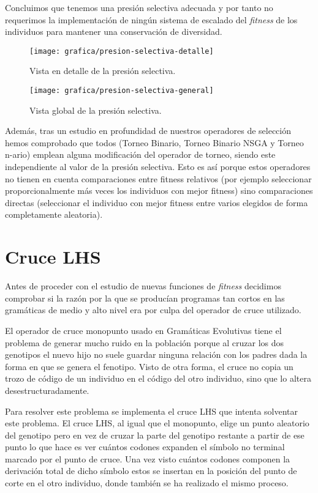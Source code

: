 Concluimos que tenemos una presión selectiva adecuada y por tanto no requerimos la implementación de ningún sistema de escalado del \textit{fitness} de los individuos para mantener una conservación de diversidad.
\begin{figure}[H]
\centering
\texttt{[image: grafica/presion-selectiva-detalle]}
\caption{Vista en detalle  de la presión selectiva.}
\end{figure}

\begin{figure}[H]
\centering
\texttt{[image: grafica/presion-selectiva-general]}
\caption{Vista global de la presión selectiva.}
\end{figure}

Además, tras un estudio en profundidad de nuestros operadores de selección hemos comprobado que todos (Torneo Binario, Torneo Binario NSGA y Torneo n-ario) emplean alguna modificación del operador de torneo, siendo este independiente al valor de la presión selectiva. Esto es así porque estos operadores no tienen en cuenta comparaciones entre fitness relativos (por ejemplo seleccionar proporcionalmente más veces los individuos con mejor fitness) sino comparaciones directas (seleccionar el individuo con mejor fitness entre varios elegidos de forma completamente aleatoria).

\section{Cruce LHS}
Antes de proceder con el estudio de nuevas funciones de \textit{fitness} decidimos comprobar si la razón por la que se producían programas tan cortos en las gramáticas de medio y alto nivel era por culpa del operador de cruce utilizado.

El operador de cruce monopunto usado en Gramáticas Evolutivas tiene el problema de generar mucho ruido en la población porque al cruzar los dos genotipos el nuevo hijo no suele guardar ninguna relación con los padres dada la forma en que se genera el fenotipo. Visto de otra forma, el cruce no copia un trozo de código de un individuo en el código del otro individuo, sino que lo altera desestructuradamente.

Para resolver este problema se implementa el cruce LHS que intenta solventar este problema. El cruce LHS, al igual que el monopunto, elige un punto aleatorio del genotipo pero en vez de cruzar la parte del genotipo restante a partir de ese punto lo que hace es ver cuántos codones expanden el símbolo no terminal marcado por el punto de cruce. Una vez visto cuántos codones componen la derivación total de dicho símbolo estos se insertan en la posición del punto de corte en el otro individuo, donde también se ha realizado el mismo proceso.

